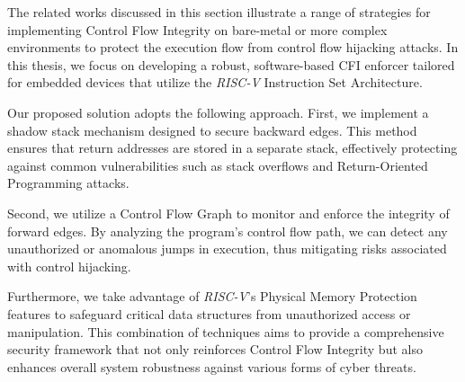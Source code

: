 The related works discussed in this section illustrate a range of strategies for
implementing Control Flow Integrity on bare-metal or more complex environments to
protect the execution flow from control flow hijacking attacks. In this thesis, we
focus on developing a robust, software-based CFI enforcer tailored for embedded
devices that utilize the \textit{RISC-V} Instruction Set Architecture.

Our proposed solution adopts the following approach. First, we implement a shadow
stack mechanism designed to secure backward edges. This method ensures that
return addresses are stored in a separate stack, effectively protecting against common
vulnerabilities such as stack overflows and Return-Oriented Programming attacks.

Second, we utilize a Control Flow Graph to monitor and enforce the integrity of
forward edges. By analyzing the program's control flow path, we can detect any
unauthorized or anomalous jumps in execution, thus mitigating risks associated with
control hijacking.

Furthermore, we take advantage of \textit{RISC-V}'s Physical Memory Protection features
to safeguard critical data structures from unauthorized access or manipulation.
This combination of techniques aims to provide a comprehensive security
framework that not only reinforces Control Flow Integrity but also enhances
overall system robustness against various forms of cyber threats.